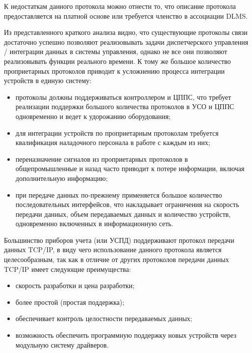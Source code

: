 К недостаткам данного протокола можно отнести то, что описание протокола предоставляется на платной основе или требуется членство в ассоциации DLMS.

Из представленного краткого анализа видно, что существующие протоколы связи достаточно успешно позволяют реализовывать задачи диспетчерского управления / интеграции данных в системы управления, однако не все они позволяют реализовывать функции реального времени. К тому же большое количество проприетарных протоколов приводит к усложнению процесса интеграции устройств в единую систему: 
\begin{itemize}
 \item протоколы должны поддерживаться контроллером и ЦППС, что требует реализации поддержки большого количества протоколов в УСО и ЦППС одновременно и ведет к удорожанию оборудования;
 \item для интеграции устройств по проприетарным протоколам требуется квалификация наладочного персонала в работе с каждым из них;
 \item переназначение сигналов из проприетарных протоколов в общепромышленные и назад часто приводит к потере информации, включая дополнительную информацию;
 \item при передаче данных по-прежнему применяется большое количество последовательных интерфейсов, что накладывает ограничения на скорость передачи данных, объем передаваемых данных и количество устройств, одновременно включенных в информационную сеть.
\end{itemize}

Большинство приборов учета (или УСПД) поддерживают протокол передачи данных TCP/IP, в виду чего использование данного протокола является целесообразным, так как в отличие от других протоколов передачи данных TCP/IP имеет следующие преимущества:

\begin{itemize}
 \item скорость разработки и цена разработки;
 \item более простой (простая поддержка);
 \item обеспечивает контроль целостности передаваемых данных;
 \item возможность обеспечить программную поддержку новых устройств через модульную систему драйверов.
\end{itemize}
